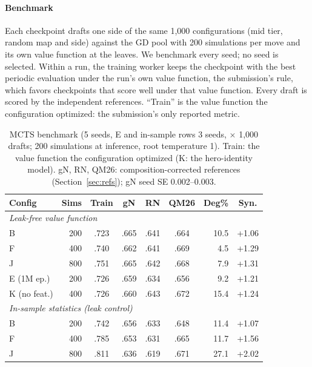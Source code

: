 \documentclass[journal]{IEEEtran}
\begin{document}
\paragraph{Benchmark} Each checkpoint drafts one side of the same 1,000 configurations (mid tier, random map and side) against the GD pool with 200 simulations per move and its own value function at the leaves. We benchmark every seed; no seed is selected. Within a run, the training worker keeps the checkpoint with the best periodic evaluation under the run's own value function, the submission's rule, which favors checkpoints that score well under that value function. Every draft is scored by the independent references. ``Train'' is the value function the configuration optimized: the submission's only reported metric.

\begin{table}[t]
\centering
\caption{MCTS benchmark (5 seeds, E and in-sample rows 3 seeds, $\times$ 1,000 drafts; 200 simulations at inference, root temperature 1). Train: the value function the configuration optimized (K: the hero-identity model). gN, RN, QM26: composition-corrected references (Section~\ref{sec:refs}); gN seed SE 0.002--0.003.}
\label{tab:mcts}
\setlength{\tabcolsep}{2.8pt}
\small
\begin{tabular}{lrccccrc}
\toprule
Config & Sims & Train & gN & RN & QM26 & Deg\% & Syn. \\
\midrule
\multicolumn{8}{l}{\textit{Leak-free value function}} \\
B & 200 & .723 & .665 & .641 & .664 & 10.5 & +1.06 \\
F & 400 & .740 & .662 & .641 & .669 & 4.5 & +1.29 \\
J & 800 & .751 & .665 & .642 & .668 & 7.9 & +1.31 \\
E (1M ep.) & 200 & .726 & .659 & .634 & .656 & 9.2 & +1.21 \\
K (no feat.) & 400 & .726 & .660 & .643 & .672 & 15.4 & +1.24 \\
\midrule
\multicolumn{8}{l}{\textit{In-sample statistics (leak control)}} \\
B & 200 & .742 & .656 & .633 & .648 & 11.4 & +1.07 \\
F & 400 & .785 & .653 & .631 & .665 & 11.7 & +1.56 \\
J & 800 & .811 & .636 & .619 & .671 & 27.1 & +2.02 \\
\bottomrule
\end{tabular}
\end{table}
\end{document}
